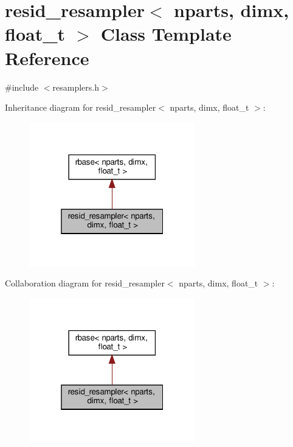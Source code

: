 \hypertarget{classresid__resampler}{}\section{resid\+\_\+resampler$<$ nparts, dimx, float\+\_\+t $>$ Class Template Reference}
\label{classresid__resampler}


{\ttfamily \#include $<$resamplers.\+h$>$}



Inheritance diagram for resid\+\_\+resampler$<$ nparts, dimx, float\+\_\+t $>$\+:\nopagebreak
\begin{figure}[H]
\begin{center}
\leavevmode
\includegraphics[width=205pt]{classresid__resampler__inherit__graph}
\end{center}
\end{figure}


Collaboration diagram for resid\+\_\+resampler$<$ nparts, dimx, float\+\_\+t $>$\+:\nopagebreak
\begin{figure}[H]
\begin{center}
\leavevmode
\includegraphics[width=205pt]{classresid__resampler__coll__graph}
\end{center}
\end{figure}
